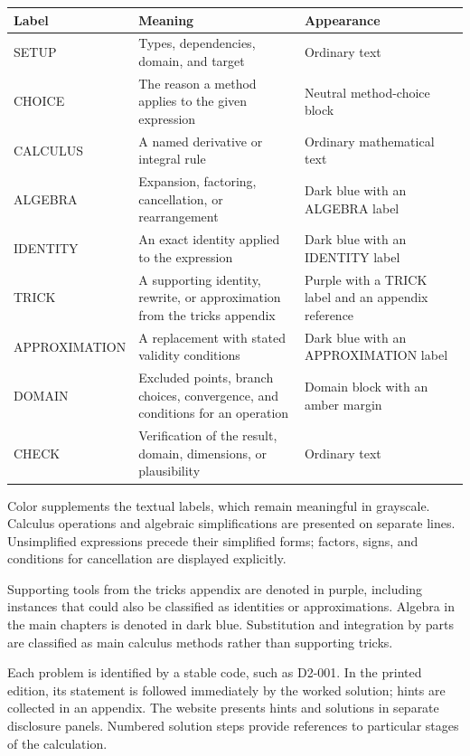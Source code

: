 \documentclass[11pt,oneside,openany]{book}
\begin{document}
\begingroup\small\setlength{\tabcolsep}{5pt}\renewcommand{\arraystretch}{1.15}
\begin{tabular}{@{}>{\raggedright\arraybackslash}p{}>{\raggedright\arraybackslash}p{}>{\raggedright\arraybackslash}p{}@{}}
\textbf{Label} & \textbf{Meaning} & \textbf{Appearance} \\[5pt]
\hline
SETUP & Types, dependencies, domain, and target & Ordinary text \\[5pt]
CHOICE & The reason a method applies to the given expression & Neutral method-choice block \\[5pt]
CALCULUS & A named derivative or integral rule & Ordinary mathematical text \\[5pt]
ALGEBRA & Expansion, factoring, cancellation, or rearrangement & Dark blue with an ALGEBRA label \\[5pt]
IDENTITY & An exact identity applied to the expression & Dark blue with an IDENTITY label \\[5pt]
TRICK & A supporting identity, rewrite, or approximation from the tricks appendix & Purple with a TRICK label and an appendix reference \\[5pt]
APPROXIMATION & A replacement with stated validity conditions & Dark blue with an APPROXIMATION label \\[5pt]
DOMAIN & Excluded points, branch choices, convergence, and conditions for an operation & Domain block with an amber margin \\[5pt]
CHECK & Verification of the result, domain, dimensions, or plausibility & Ordinary text \\[5pt]
\end{tabular}\endgroup

Color supplements the textual labels, which remain meaningful in grayscale.
Calculus operations and algebraic simplifications are presented on separate
lines. Unsimplified expressions precede their simplified forms; factors,
signs, and conditions for cancellation are displayed explicitly.

Supporting tools from the tricks appendix are denoted
in purple, including instances that could also be classified as identities
or approximations. Algebra in the main chapters is denoted in dark blue.
Substitution and integration by parts are classified as main calculus
methods rather than supporting tricks.

Each problem is identified by a stable code, such as D2-001. In the printed edition, its statement is followed immediately by the worked
solution; hints are collected in an appendix. The website presents hints and
solutions in separate disclosure panels. Numbered
solution steps provide references to particular stages of the calculation.
\end{document}
